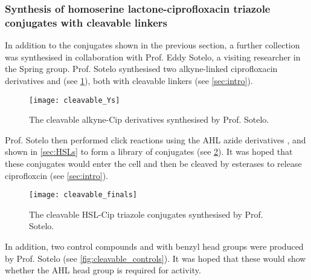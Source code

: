 \subsubsection{Synthesis of homoserine lactone-ciprofloxacin triazole conjugates with cleavable linkers\label{sec:cleavable}}

In addition to the conjugates shown in the previous section, a further collection was synthesised in collaboration with Prof. Eddy Sotelo, a visiting researcher in the Spring group. Prof. Sotelo synthesised two alkyne-linked ciprofloxacin derivatives  and  (see \ref{fig:cleavable_Ys}), both with cleavable linkers (see \ref{sec:intro}). 

\begin{figure}[H]
	\begin{center}
		\texttt{[image: cleavable\_Ys]}
		\caption{
			The cleavable alkyne-Cip derivatives synthesised by Prof. Sotelo.
			\label{fig:cleavable_Ys}}
	\end{center}
\end{figure}

Prof. Sotelo then performed click reactions using the AHL azide derivatives ,  and  shown in \ref{sec:HSLs} to form a library of conjugates (see \ref{fig:cleavable_finals}). It was hoped that these conjugates would enter the cell and then be cleaved by esterases to release ciprofloxcin (see \ref{sec:intro}).

\begin{figure}[H]
	\begin{center}
		\texttt{[image: cleavable\_finals]}
		\caption{
			The cleavable HSL-Cip triazole conjugates synthesised by Prof. Sotelo.
			\label{fig:cleavable_finals}}
	\end{center}
\end{figure}

In addition, two control compounds  and  with benzyl head groups were produced by Prof. Sotelo (see \ref{fig:cleavable_controls}). It was hoped that these would show whether the AHL head group is required for activity.

